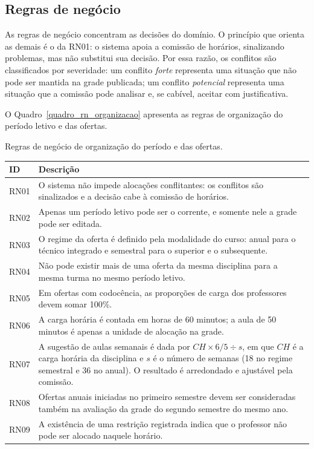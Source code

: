 \subsection{Regras de negócio}
\label{sub_cap_regras_negocio}

As regras de negócio concentram as decisões do domínio. O princípio que orienta as demais é o da RN01: o sistema apoia a comissão de horários, sinalizando problemas, mas não substitui sua decisão. Por essa razão, os conflitos são classificados por severidade: um conflito \textit{forte} representa uma situação que não pode ser mantida na grade publicada; um conflito \textit{potencial} representa uma situação que a comissão pode analisar e, se cabível, aceitar com justificativa.

O Quadro~\ref{quadro_rn_organizacao} apresenta as regras de organização do período letivo e das ofertas.

\begin{quadro}[H]
\centering
\small
\renewcommand{\arraystretch}{1.25}
\caption{Regras de negócio de organização do período e das ofertas.}
\label{quadro_rn_organizacao}
\begin{tabularx}{\textwidth}{|I|X|}
\hline
\textbf{ID} & \textbf{Descrição} \\ \hline
RN01 & O sistema não impede alocações conflitantes: os conflitos são sinalizados e a decisão cabe à comissão de horários. \\ \hline
RN02 & Apenas um período letivo pode ser o corrente, e somente nele a grade pode ser editada. \\ \hline
RN03 & O regime da oferta é definido pela modalidade do curso: anual para o técnico integrado e semestral para o superior e o subsequente. \\ \hline
RN04 & Não pode existir mais de uma oferta da mesma disciplina para a mesma turma no mesmo período letivo. \\ \hline
RN05 & Em ofertas com codocência, as proporções de carga dos professores devem somar 100\%. \\ \hline
RN06 & A carga horária é contada em horas de 60 minutos; a aula de 50 minutos é apenas a unidade de alocação na grade. \\ \hline
RN07 & A sugestão de aulas semanais é dada por $\mathit{CH} \times 6/5 \div s$, em que $\mathit{CH}$ é a carga horária da disciplina e $s$ é o número de semanas (18 no regime semestral e 36 no anual). O resultado é arredondado e ajustável pela comissão. \\ \hline
RN08 & Ofertas anuais iniciadas no primeiro semestre devem ser consideradas também na avaliação da grade do segundo semestre do mesmo ano. \\ \hline
RN09 & A existência de uma restrição registrada indica que o professor não pode ser alocado naquele horário. \\ \hline
\end{tabularx}
\end{quadro}

